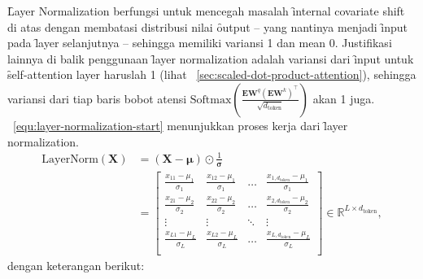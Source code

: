 	\f{Layer Normalization} berfungsi untuk mencegah masalah \f{internal covariate shift} di atas dengan membatasi distribusi nilai \f{output} -- yang nantinya menjadi \f{input} pada \f{layer} selanjutnya -- sehingga memiliki variansi 1 dan mean 0. Justifikasi lainnya di balik penggunaan \f{layer normalization} adalah variansi dari \f{input} untuk \f{self-attention layer} haruslah 1 (lihat \sect~\ref{sec:scaled-dot-product-attention}), sehingga variansi dari tiap baris bobot atensi $\text{Softmax}(\frac{\mathbf{EW}^q (\mathbf{EW}^k)^{\top}}{\sqrt{d_{\text{token}}}})$ akan 1 juga. \equ~\ref{equ:layer-normalization-start} menunjukkan proses kerja dari \f{layer normalization}.
	\begin{align}
		\label{equ:layer-normalization-start}
		\nonumber \text{LayerNorm}(\mathbf{X}) &= (\mathbf{X}-\bm{\mu})\odot \frac{1}{\bm{\sigma}}\\
		&= \begin{bmatrix}
			\frac{x_{11}-\mu_1}{\sigma_1} & \frac{x_{12}-\mu_1}{\sigma_1} & \dots & \frac{x_{1,d_{\text{token}}}-\mu_1}{\sigma_1} \\
			\frac{x_{21}-\mu_2}{\sigma_2} & \frac{x_{22}-\mu_2}{\sigma_2} & \dots & \frac{x_{2,d_{\text{token}}}-\mu_2}{\sigma_2} \\
			\vdots & \vdots & \ddots & \vdots \\
			\frac{x_{L1}-\mu_L}{\sigma_L} & \frac{x_{L2}-\mu_L}{\sigma_L} & \dots & \frac{x_{L,d_{\text{token}}}-\mu_L}{\sigma_L} \\
		\end{bmatrix} \in \mathbb{R}^{L \times d_{\text{token}}}, 
	\end{align}
	dengan keterangan berikut:
